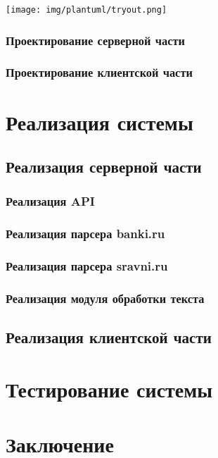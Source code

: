 \documentclass[PI, VKR]{HSEUniversity}
\begin{document}
\begin{center}
\texttt{[image: img/plantuml/tryout.png]}
\end{center}

\subsection{Проектирование серверной части}
\label{sec:org3af2cea}
\subsection{Проектирование клиентской части}
\label{sec:org5f7deb1}

\chapter{Реализация системы}
\label{sec:org958a9ce}
\section{Реализация серверной части}
\label{sec:org2394a21}
\subsection{Реализация API}
\label{sec:orgf7c6129}
\subsection{Реализация парсера banki.ru}
\label{sec:orgc9a837a}
\subsection{Реализация парсера sravni.ru}
\label{sec:orgb920ead}
\subsection{Реализация модуля обработки текста}
\label{sec:orgc09b9a9}
\section{Реализация клиентской части}
\label{sec:org30f9240}
\chapter{Тестирование системы}
\label{sec:org84f65b2}
\chapter*{Заключение}
\label{sec:org508436a}
\nocite{*}
\putbibliography
\appendix
\end{document}

